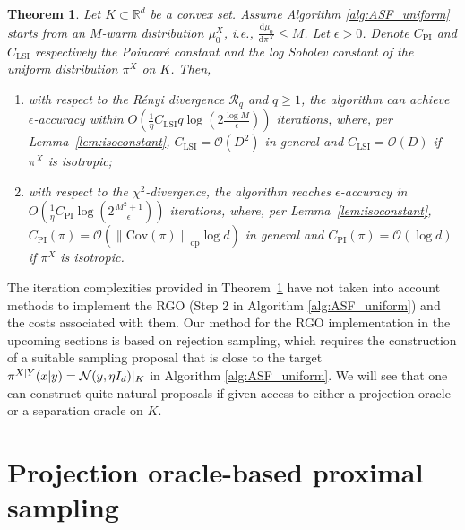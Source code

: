 \documentclass[11pt,letterpaper]{article}
\newcommand{\R}{\mathbb{R}}
\newcommand{\norm}[1]{\left\lVert #1 \right\rVert}
\newcommand{\cov}[1]{\mathrm{Cov}{\left( #1\right)}}
\newcommand{\opnorm}[1]{\norm{#1}_{\operatorname{op}}}
\newcommand{\D}{\mathrm{d}}
\newcommand{\brac}[1]{\left( #1\right)}
\newtheorem{theorem}[thm]{Theorem}
\begin{document}
\begin{theorem}
    \label{theo:outer}
 Let $K\subset \R^d$ be a convex set. Assume Algorithm \ref{alg:ASF_uniform} starts from an $M$-warm distribution $\mu^X_0$, i.e., $\frac{\D\mu_0}{\D \pi^X}\leq M$. Let $\epsilon>0$. Denote $C_{\mathrm{PI}}$ and $C_{\mathrm{LSI}}$ respectively the Poincar\'{e} constant and the log Sobolev constant of the uniform distribution $\pi^X$ on $K$. Then, 


\begin{enumerate}[label=\alph*)]
    \item with respect to the R\'{e}nyi divergence $\mathcal{R}_q$ and $q\geq 1$,  the algorithm can achieve $\epsilon$-accuracy within $ O\brac{\frac{1}{\eta}{C_{\mathrm{LSI}}q\log \brac{2\frac{\log M}{\epsilon}} }}$
iterations, where, per Lemma~\ref{lem:isoconstant}, $C_{\mathrm{LSI}}=\mathcal{O}(D^2)$ in general and $C_{\mathrm{LSI}}=\mathcal{O}(D)$ if $\pi^X$ is isotropic;

\item with respect to the $\chi^2$-divergence, the algorithm reaches $\epsilon$-accuracy in $O\brac{\frac{1}{\eta}{C_{\mathrm{PI}}\log \brac{2\frac{M^2+1}{\epsilon}}  } } $
iterations, where, per Lemma~\ref{lem:isoconstant}, $C_{\mathrm{PI}}(\pi)=  \mathcal{O}\brac{\opnorm{\cov {\pi}}\log d}$ in general and $C_{\mathrm{PI}}(\pi)=  \mathcal{O}\brac{\log d}$ if $\pi^X$ is isotropic. 
\end{enumerate}

\end{theorem}
The iteration complexities provided in Theorem~\ref{theo:outer} have not taken into account methods to implement the RGO (Step 2 in Algorithm \ref{alg:ASF_uniform}) and the costs associated with them. Our method for the RGO implementation in the upcoming sections is based on rejection sampling, which requires the construction of a suitable sampling proposal that is close to the target $\pi^{X|Y}(x|y)={\cal N}(y,\eta I_d)|_K$ in Algorithm \ref{alg:ASF_uniform}. We will see that one can construct quite natural proposals if given access to either a projection oracle or a separation oracle on $K$. 






\section{Projection oracle-based proximal sampling} \label{sec:projection_uniform}
\end{document}
